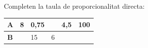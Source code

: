 \begin{autoaval}{46}

\begin{mylist}

\exer[2]
  Completen la taula de proporcionalitat directa:

\begin{center}
\begin{tabular}[]{|p{1.2cm}|p{1.2cm}|p{1.2cm}|p{1.2cm}|p{1.2cm}|p{1.2cm}|}
\hline
\cellcolor{lightgray}
\begin{minipage}[b]{0.16\columnwidth}\raggedright\strut

\textbf{A}
\strut
\end{minipage} & \begin{minipage}[b]{0.16\columnwidth}\raggedright\strut

8
\strut
\end{minipage} & \begin{minipage}[b]{0.16\columnwidth}\raggedright\strut

0,75
\strut
\end{minipage} & \begin{minipage}[b]{0.16\columnwidth}\raggedright\strut
\strut
\end{minipage} & \begin{minipage}[b]{0.16\columnwidth}\raggedright\strut

4,5
\strut
\end{minipage} & \begin{minipage}[b]{0.16\columnwidth}\raggedright\strut

100
\strut
\end{minipage}\tabularnewline \hline
\cellcolor{lightgray}
\begin{minipage}[t]{0.16\columnwidth}\raggedright\strut

\textbf{B}
\strut
\end{minipage} & \begin{minipage}[t]{0.16\columnwidth}\raggedright\strut
\strut
\end{minipage} & \begin{minipage}[t]{0.16\columnwidth}\raggedright\strut

15
\strut
\end{minipage} & \begin{minipage}[t]{0.16\columnwidth}\raggedright\strut

6
\strut
\end{minipage} & \begin{minipage}[t]{0.16\columnwidth}\raggedright\strut
\strut
\end{minipage} & \begin{minipage}[t]{0.16\columnwidth}\raggedright\strut
\strut
\end{minipage}\tabularnewline
\hline
\end{tabular}
\end{center}


\end{mylist}
\end{autoaval}
